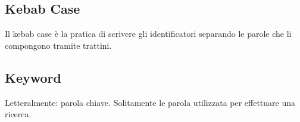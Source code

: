 
\subsection*{Kebab Case}
Il kebab case è la pratica di scrivere gli identificatori separando le parole che li compongono tramite trattini.

\subsection*{Keyword}
Letteralmente: parola chiave. Solitamente le parola utilizzata per effettuare una ricerca.

